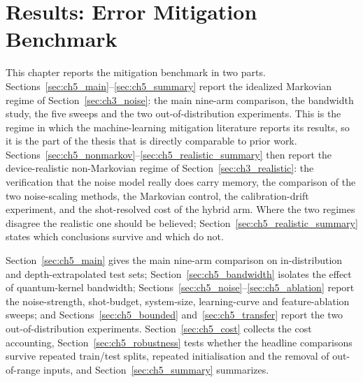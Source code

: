 \documentclass[Thesis.tex]{subfiles}
\begin{document}
\newpage
\setcounter{chapter}{4} %


\thispagestyle{empty}

\chapter{Results: Error Mitigation Benchmark}\label{chap5:results}

This chapter reports the mitigation benchmark in two parts.
Sections~\ref{sec:ch5_main}--\ref{sec:ch5_summary} report the idealized Markovian
regime of Section~\ref{sec:ch3_noise}: the main nine-arm comparison, the bandwidth
study, the five sweeps and the two out-of-distribution experiments. This is the
regime in which the machine-learning mitigation literature reports its results, so
it is the part of the thesis that is directly comparable to prior work.
Sections~\ref{sec:ch5_nonmarkov}--\ref{sec:ch5_realistic_summary} then report the
device-realistic non-Markovian regime of Section~\ref{sec:ch3_realistic}: the
verification that the noise model really does carry memory, the comparison of the
two noise-scaling methods, the Markovian control, the calibration-drift experiment,
and the shot-resolved cost of the hybrid arm. Where the two regimes disagree the
realistic one should be believed; Section~\ref{sec:ch5_realistic_summary} states
which conclusions survive and which do not.

Section~\ref{sec:ch5_main} gives the
main nine-arm comparison on in-distribution and depth-extrapolated test sets;
Section~\ref{sec:ch5_bandwidth} isolates the effect of quantum-kernel bandwidth;
Sections~\ref{sec:ch5_noise}--\ref{sec:ch5_ablation} report the noise-strength,
shot-budget, system-size, learning-curve and feature-ablation sweeps; and
Sections~\ref{sec:ch5_bounded} and~\ref{sec:ch5_transfer} report the two
out-of-distribution experiments. Section~\ref{sec:ch5_cost} collects the
cost accounting, Section~\ref{sec:ch5_robustness} tests whether the headline
comparisons survive repeated train/test splits, repeated initialisation and the
removal of out-of-range inputs, and Section~\ref{sec:ch5_summary} summarizes.
\end{document}
